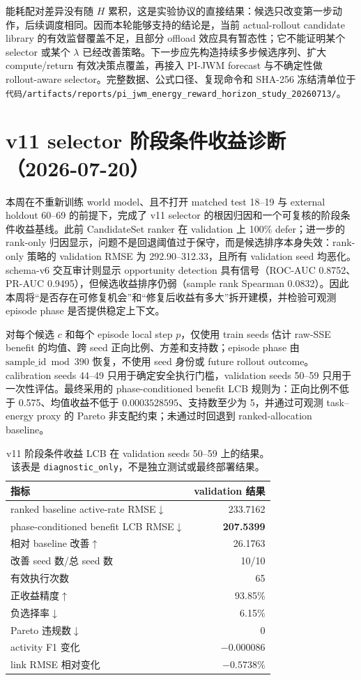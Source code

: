 \documentclass[UTF8,a4paper,11pt]{ctexart}
\newcommand{\code}[1]{\texttt{#1}}
\begin{document}
能耗配对差异没有随 $H$ 累积，这是实验协议的直接结果：候选只改变第一步动作，后续调度相同。因而本轮能够支持的结论是，当前 actual-rollout candidate library 的有效监督覆盖不足，且部分 offload 效应具有暂态性；它不能证明某个 selector 或某个 $\lambda$ 已经改善策略。下一步应先构造持续多步候选序列、扩大 compute/return 有效决策点覆盖，再接入 PI-JWM forecast 与不确定性做 rollout-aware selector。完整数据、公式口径、复现命令和 SHA-256 冻结清单位于 \code{代码/artifacts/reports/pi\_jwm\_energy\_reward\_horizon\_study\_20260713/}。

\section{v11 selector 阶段条件收益诊断（2026-07-20）}

本周在不重新训练 world model、且不打开 matched test 18--19 与 external holdout 60--69 的前提下，完成了 v11 selector 的根因归因和一个可复核的阶段条件收益基线。此前 CandidateSet ranker 在 validation 上 100\% defer；进一步的 rank-only 归因显示，问题不是回退阈值过于保守，而是候选排序本身失效：rank-only 策略的 validation RMSE 为 292.90--312.33，且所有 validation seed 均恶化。schema-v6 交互审计则显示 opportunity detection 具有信号（ROC-AUC 0.8752、PR-AUC 0.9495），但候选收益排序仍弱（sample rank Spearman 0.0832）。因此本周将“是否存在可修复机会”和“修复后收益有多大”拆开建模，并检验可观测 episode phase 是否提供稳定上下文。

对每个候选 $c$ 和每个 episode local step $p$，仅使用 train seeds 估计 raw-SSE benefit 的均值、跨 seed 正向比例、方差和支持数；episode phase 由 $\text{sample\_id}\bmod390$ 恢复，不使用 seed 身份或 future rollout outcome。calibration seeds 44--49 只用于确定安全执行门槛，validation seeds 50--59 只用于一次性评估。最终采用的 phase-conditioned benefit LCB 规则为：正向比例不低于 0.575、均值收益不低于 $0.0003528595$、支持数至少为 5，并通过可观测 task--energy proxy 的 Pareto 非支配约束；未通过时回退到 ranked-allocation baseline。

\begin{table}[H]
\centering
\small
\begin{tabular}{lr}
\toprule
指标 & validation 结果 \\
\midrule
ranked baseline active-rate RMSE$\downarrow$ & 233.7162 \\
phase-conditioned benefit LCB RMSE$\downarrow$ & \textbf{207.5399} \\
相对 baseline 改善$\uparrow$ & 26.1763 \\
改善 seed 数/总 seed 数 & 10/10 \\
有效执行次数 & 65 \\
正收益精度$\uparrow$ & 93.85\% \\
负选择率$\downarrow$ & 6.15\% \\
Pareto 违规数$\downarrow$ & 0 \\
activity F1 变化 & $-0.000086$ \\
link RMSE 相对变化 & $-0.5738\%$ \\
\bottomrule
\end{tabular}
\caption{v11 阶段条件收益 LCB 在 validation seeds 50--59 上的结果。该表是 \code{diagnostic\_only}，不是独立测试或最终部署结果。}
\label{tab:phase_selector_progress}
\end{table}
\end{document}
